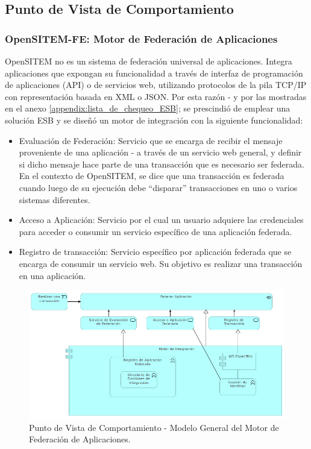\subsection{Punto de Vista de Comportamiento}

\subsubsection{OpenSITEM-FE: Motor de Federación de Aplicaciones}

OpenSITEM no es un sistema de federación universal de aplicaciones. Integra aplicaciones que expongan su funcionalidad a través de interfaz de programación de aplicaciones (API) o de servicios web, utilizando protocolos de la pila TCP/IP con representación basada en XML o JSON. Por esta razón - y por las mostradas en el anexo \ref{appendix:lista_de_chequeo_ESB}; se prescindió de emplear una solución ESB y se diseñó un motor de integración con la siguiente funcionalidad:
\begin{itemize}
 \item Evaluación de Federación: Servicio que se encarga de recibir el mensaje proveniente de una aplicación - a través de un servicio web general, y definir si dicho mensaje hace parte de una transacción que es necesario ser federada. En el contexto de OpenSITEM, se dice que una transacción es federada cuando luego de su ejecución debe ``disparar'' transacciones en uno o varios sistemas diferentes.
 \item Acceso a Aplicación: Servicio por el cual un usuario adquiere las credenciales para acceder o consumir un servicio específico de una aplicación federada.
 \item 	Registro de transacción: Servicio específico por aplicación federada que se encarga de consumir un servicio web. Su objetivo es realizar una transacción en una aplicación. 
\end{itemize}

\begin{figure}
 \centering
 \includegraphics[width=120mm]{motor_integracion_vista_comportamiento.png}
 \caption{Punto de Vista de Comportamiento - Modelo General del Motor de Federación de Aplicaciones.}
 \label{punto_infraestructura}
\end{figure}


